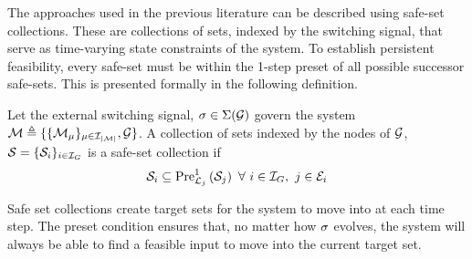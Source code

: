 The approaches used in the previous literature can be described using safe-set collections. These are collections of sets, indexed by the switching signal, that serve as time-varying state constraints of the system. To establish persistent feasibility, every safe-set must be within the 1-step preset of all possible successor safe-sets. This is presented formally in the following definition.
\begin{definition}
Let the external switching signal, $\ss\in\Sigma(\graph)$ govern the system $\modes\triangleq\{\{\mode{\modeidx}\}_{\modeidx\in\idxset{\nummodes}}, \graph\}$. A collection of sets indexed by the nodes of $\graph$, $\mathcal{S}=\{\mathcal{S}_{i}\}_{i\in\idxset{\gnumnodes}}$ is a safe-set collection if
$$\mathcal{S}_{i}\subseteq\Pre[\gnodelabel{j}][1]{\mathcal{S}_{j}}\ \forall\ i\in\idxset{\gnumnodes},\ j\in \gnodeedges{i}$$
\end{definition}
Safe set collections create target sets for the system to move into at each time step. The preset condition ensures that, no matter how $\ss$ evolves, the system will always be able to find a feasible input to move into the current target set.
